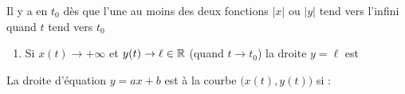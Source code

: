 \begin{frame}

\begin{mydefinition}
Il y a  en $t_0$ dès que l'une au moins des deux 
fonctions $|x|$ ou $|y|$ tend vers l'infini quand $t$ tend vers $t_0$ 
\end{mydefinition}
\pause
\begin{enumerate}
\item Si $x(t) \to +\infty$ et $y(t) \to \ell \in \mathbb{R}$ (quand $t \to t_0$)
la droite $y=\ell$ est 



\end{enumerate}



\end{frame}


\begin{frame}

\begin{mydefinition}
La droite d'équation 
$y=ax+b$ est  à la courbe $\big(x(t),y(t) \big)$ si :

\begin{enumerate}

\end{enumerate}
\end{mydefinition}

\bigskip

\begin{minipage}{0.49\textwidth}
\end{minipage}
\begin{minipage}{0.5\textwidth}
\vspace*{-3ex}
\end{minipage}


\end{frame}


